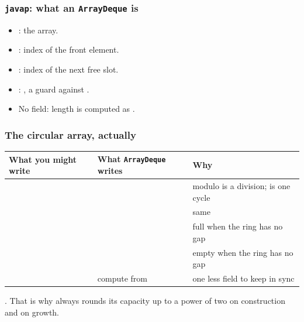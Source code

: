 \documentclass[aspectratio=169,10pt,compress]{beamer}
\begin{document}
\begin{frame}[t,fragile] \frametitle{\texttt{javap}: what an \texttt{ArrayDeque} is}
  \begin{itemize}\small
    \item {}: the array.
    \item {}: index of the front element.
    \item {}: index of the next free slot.
    \item {}: ,
          a guard against .
    \item No  field: length is computed as
          .
  \end{itemize}
\end{frame}




\begin{frame}[t,fragile] \frametitle{The circular array, actually}
  \begin{center}\footnotesize
  \begin{tabular}{L{0.24\textwidth}L{0.34\textwidth}L{0.30\textwidth}}
    \toprule
    \textbf{What you might write} & \textbf{What \texttt{ArrayDeque} writes} & \textbf{Why} \\
    \midrule
        &  & modulo is a division; \hCode{\&} is one cycle \\
        &  & same \\
                     &                 & full when the ring has no gap \\
                     &                 & empty when the ring has no gap \\
                          & compute from       & one less field to keep in sync \\
    \bottomrule
  \end{tabular}
  \end{center}
  \vspace{0.3em}
  \small
  . That is why
   always rounds its capacity up to a power of two
  on construction and on growth.
\end{frame}
\end{document}
